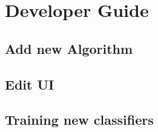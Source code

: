 \section{Developer Guide}
\subsection{Add new Algorithm}
\subsection{Edit UI}
\subsection{Training new classifiers}